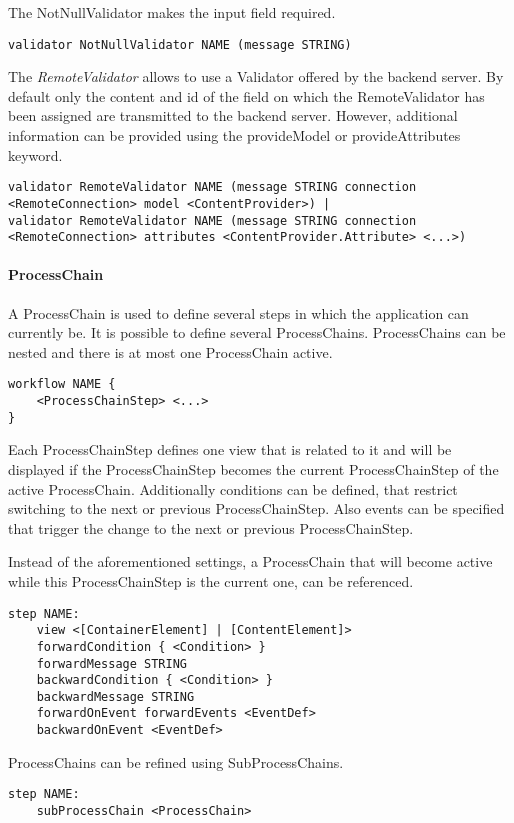 The NotNullValidator makes the input field required.
\begin{lstlisting}
validator NotNullValidator NAME (message STRING)
\end{lstlisting}

The \textit{RemoteValidator} allows to use a Validator offered by the backend server. By default only the content and id of the field on which the RemoteValidator has been assigned are transmitted to the backend server. However, additional information can be provided using the provideModel or
provideAttributes keyword.
\begin{lstlisting}
validator RemoteValidator NAME (message STRING connection <RemoteConnection> model <ContentProvider>) |
validator RemoteValidator NAME (message STRING connection <RemoteConnection> attributes <ContentProvider.Attribute> <...>)
\end{lstlisting}

\paragraph{ProcessChain}
A ProcessChain is used to define several steps in which the application can currently be. It is possible to define several ProcessChains. ProcessChains can be nested and there is at most one ProcessChain active.
\begin{lstlisting}
workflow NAME {
	<ProcessChainStep> <...>
}
\end{lstlisting}

 Each ProcessChainStep defines one view that is related to it and will be displayed if the ProcessChainStep becomes the current ProcessChainStep of the active ProcessChain. Additionally conditions can be defined, that restrict switching to the next or previous ProcessChainStep. Also events can be specified that trigger the change to the next or previous ProcessChainStep.
 
Instead of the aforementioned settings, a ProcessChain that will become active while this ProcessChainStep is the current one, can be referenced.
\begin{lstlisting}
step NAME:
	view <[ContainerElement] | [ContentElement]>
	forwardCondition { <Condition> }
	forwardMessage STRING
	backwardCondition { <Condition> }
	backwardMessage STRING
	forwardOnEvent forwardEvents <EventDef>
	backwardOnEvent <EventDef>
\end{lstlisting}

ProcessChains can be refined using SubProcessChains.
\begin{lstlisting}
step NAME:
	subProcessChain <ProcessChain>
\end{lstlisting}

